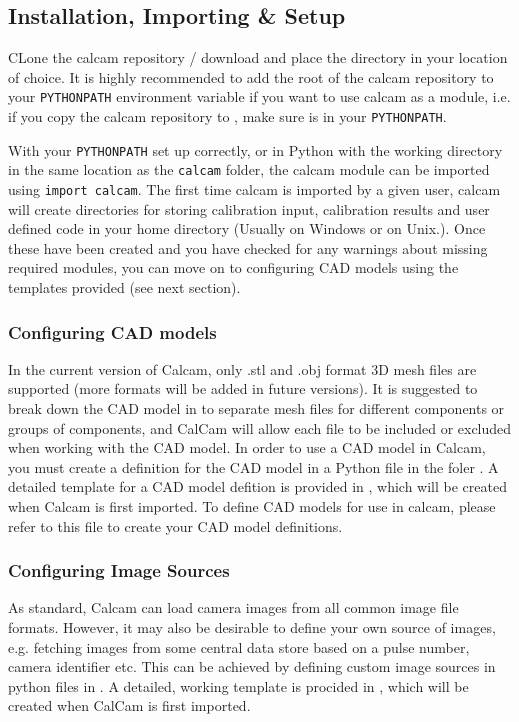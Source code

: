 \documentclass[12pt]{article}
\newcommand{\code}[1]{\texttt{#1}}
\begin{document}
\subsection{Installation, Importing \& Setup}

CLone the calcam repository / download and place the directory in your location of choice. It is highly recommended to add the root of the calcam repository to your \code{PYTHONPATH} environment variable if you want to use calcam as a module, i.e. if you copy the calcam repository to , make sure  is in your \code{PYTHONPATH}.

With your \code{PYTHONPATH} set up correctly, or in Python with the working directory in the same location as the \code{calcam} folder, the calcam module can be imported using \code{import calcam}. The first time calcam is imported by a given user, calcam will create directories for storing calibration input, calibration results and user defined code in your home directory (Usually  on Windows or  on Unix.). Once these have been created and you have checked for any warnings about missing required modules, you can move on to configuring CAD models using the templates provided (see next section).

\subsubsection{Configuring CAD models}
\label{sec:cad_config}
In the current version of Calcam, only .stl and .obj format 3D mesh files are supported (more formats will be added in future versions). It is suggested to break down the CAD model in to separate mesh files for different components or groups of components, and CalCam will allow each file to be included or excluded when working with the CAD model. In order to use a CAD model in Calcam, you must create a definition for the CAD model in a Python file in the foler . A detailed template for a CAD model defition is provided in , which will be created when Calcam is first imported. To define CAD models for use in calcam, please refer to this file to create your CAD model definitions.

\subsubsection{Configuring Image Sources}
\label{sec:image_sources}
As standard, Calcam can load camera images from all common image file formats. However, it may also be desirable to define your own source of images, e.g. fetching images from some central data store based on a pulse number, camera identifier etc. This can be achieved by defining custom image sources in python files in . A detailed, working template is procided in , which will be created when CalCam is first imported.
\end{document}
